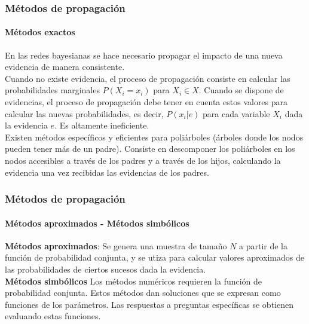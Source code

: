 \documentclass[leqno]{beamer}
\begin{document}
\begin{frame}
\frametitle{Métodos de propagación}
\framesubtitle{Métodos exactos}
En las redes bayesianas se hace necesario propagar el impacto de una nueva evidencia de manera consistente.\\
Cuando no existe evidencia, el proceso de propagación consiste en calcular las probabilidades marginales $P(X_i=x_i)$ para $X_i \in X$. Cuando se dispone de evidencias, el proceso de propagación debe tener en cuenta estos valores para calcular las nuevas probabilidades, es decir, $P(x_i| e)$ para cada variable $X_i$ dada la evidencia $e$. Es altamente ineficiente.\\
Existen métodos específicos y eficientes para poliárboles (árboles donde los nodos pueden tener más de un padre). Consiste en descomponer los poliárboles en los nodos accesibles a través de los padres y a través de los hijos, calculando la evidencia una vez recibidas las evidencias de los padres.
\end{frame}

\begin{frame}
\frametitle{Métodos de propagación}
\framesubtitle{Métodos aproximados - Métodos simbólicos}

\textbf{Métodos aproximados}: Se genera una muestra de tamaño $N$ a partir de la función de probabilidad conjunta, y se utiza para calcular valores aproximados de las probabilidades de ciertos sucesos dada la evidencia. \\
\textbf{Métodos simbólicos} Los métodos numéricos requieren la función de probabilidad conjunta. Estos métodos dan soluciones que se expresan como funciones de los parámetros. Las respuestas a preguntas específicas se obtienen evaluando estas funciones.

\end{frame}
\end{document}
